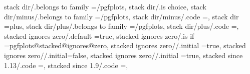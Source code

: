 stack dir/.belongs to family                                       =/pgfplots,                                                                                                                         
stack dir/.is choice,
stack dir/minus/.belongs to family                                 =/pgfplots,                                                                                                                         
stack dir/minus/.code                                              ={\pgfplots@stacked@plusfalse},                                                                                                     
stack dir                                                          =plus,                                                                                                                              
stack dir/plus/.belongs to family                                  =/pgfplots,                                                                                                                         
stack dir/plus/.code                                               ={\pgfplots@stacked@plustrue},                                                                                                      
stacked ignores zero/.default                                      =true,                                                                                                                              
stacked ignores zero/.is if                                        =pgfplots@stacked@ignores@zero,                                                                                                     
stacked ignores zero/\pgfplotsaxis@visphase@name@default/.initial  =true,                                                                                                                              
stacked ignores zero/\pgfplotsaxis@visphase@name@errorbars/.initial=false,                                                                                                                             
stacked ignores zero/\pgfplotsaxis@visphase@name@markers/.initial  =true,                                                                                                                              
stacked since 1.13/.code                                           =,                                                                                                                                  
stacked since 1.9/.code                                            ={},                                                                                                                                
